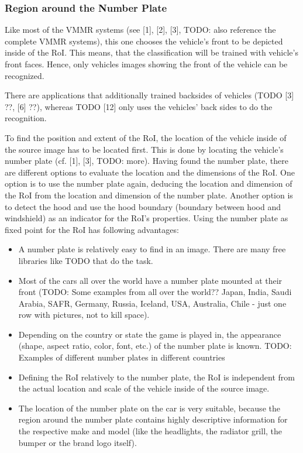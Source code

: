\subsubsection{Region around the Number Plate}\label{sec:regionAroundNumberPlate}
Like most of the VMMR systems (see [1], [2], [3], TODO: also reference the complete VMMR systems), this one chooses the vehicle’s front to be depicted inside of the RoI. This means, that the classification will be trained with vehicle’s front faces. Hence, only vehicles images showing the front of the vehicle can be recognized.

There are applications that additionally trained backsides of vehicles (TODO [3] ??, [6] ??), whereas TODO [12] only uses the vehicles’ back sides to do the recognition.

To find the position and extent of the RoI, the location of the vehicle inside of the source image has to be located first. This is done by locating the vehicle’s number plate (cf. [1], [3], TODO: more). Having found the number plate, there are different options to evaluate the location and the dimensions of the RoI. One option is to use the number plate again, deducing the location and dimension of the RoI from the location and dimension of the number plate. Another option is to detect the hood and use the hood boundary (boundary between hood and windshield) as an indicator for the RoI’s properties. Using the number plate as fixed point for the RoI has following advantages:

\begin{itemize}
  \item A number plate is relatively easy to find in an image. There are many free libraries like TODO that do the task.
  \item Most of the cars all over the world have a number plate mounted at their front (TODO: Some examples from all over the world?? Japan, India, Saudi Arabia, SAFR, Germany, Russia, Iceland, USA, Australia, Chile - just one row with pictures, not to kill space).
  \item Depending on the country or state the game is played in, the appearance (shape, aspect ratio, color, font, etc.) of the number plate is known. TODO: Examples of different number plates in different countries
  \item Defining the RoI relatively to the number plate, the RoI is independent from the actual location and scale of the vehicle inside of the source image.
  \item The location of the number plate on the car is very suitable, because the region around the number plate contains highly descriptive information for the respective make and model (like the headlights, the radiator grill, the bumper or the brand logo itself).
\end{itemize}

